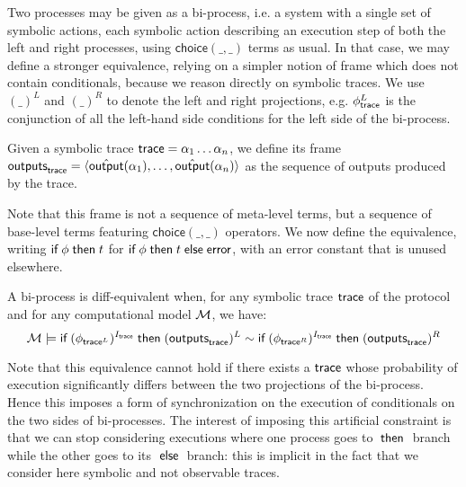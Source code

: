 \newcommand{\diff}[2]{\mathsf{choice}(#1,#2)}

Two processes may be given as a bi-process, i.e. a system with a single
set of symbolic actions, each symbolic action describing an execution step
of both the left and right processes, using $\diff{\_}{\_}$
terms as usual. In that case, we may define a stronger equivalence,
relying on a simpler notion of frame which does not contain conditionals,
because we reason directly on symbolic traces.
We use $(\_)^L$ and $(\_)^R$ to denote the left and right projections,
e.g. $\phi_{\textsf{trace}}^L$ is the conjunction of all the left-hand side
conditions for the left side of the bi-process.

\begin{definition}
  Given a symbolic trace $\textsf{trace} = \alpha_1\ldots\alpha_n$, we define its frame
  $\textsf{outputs}_{\textsf{trace}} = \langle \hat{\textsf{output}}(\alpha_1),\dots,\hat{\textsf{output}}(\alpha_n) \rangle$
  as the sequence of outputs produced by the trace.
\end{definition}

Note that this frame is not a sequence of meta-level terms,
but a sequence of base-level terms featuring
$\diff{\_}{\_}$ operators.
We now define the equivalence,
writing $\textsf{if}\; \phi \;\textsf{then}\; t$ for $\textsf{if}\; \phi \;\textsf{then}\; t \;\textsf{else}\;
\mathsf{error}$, with an error constant that is unused elsewhere.

\begin{definition}
  A bi-process is diff-equivalent when,
  for any symbolic trace $\textsf{trace}$ of the protocol and
  for any computational model $\mathcal{M}$,
  we have:
  $$\mathcal{M} \models
  \textsf{if}\; (\phi_{\textsf{trace}^L})^{I_{\textsf{trace}}} \;\textsf{then}\; (\textsf{outputs}_{\textsf{trace}})^L
  \sim
  \textsf{if}\; (\phi_{\textsf{trace}^R})^{I_{\textsf{trace}}} \;\textsf{then}\; (\textsf{outputs}_{\textsf{trace}})^R$$
\end{definition}

Note that this equivalence cannot hold if there exists a $\textsf{trace}$
whose probability of execution significantly differs between the two
projections of the bi-process.
Hence this imposes a form of synchronization on the execution of
conditionals on the two sides of bi-processes.
The interest of imposing this artificial constraint is that we
can stop considering executions where one process goes to $\;\textsf{then}\;$
branch while the other goes to its $\;\textsf{else}\;$ branch: this is implicit
in the fact that we consider here symbolic and not observable traces.

\newcommand{\In}{\mathsf{in}}
\newcommand{\Out}{\mathsf{out}}

